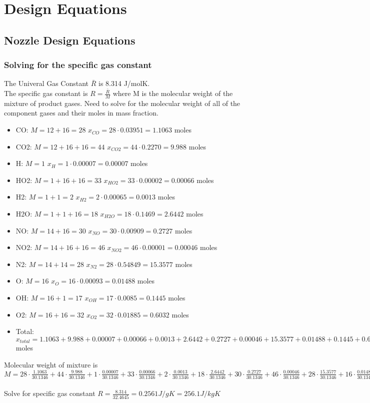 \documentclass[12pt, letter paper]{article}
\begin{document}
	\section{Design Equations}
		\subsection{Nozzle Design Equations}
			\subsubsection{Solving for the specific gas constant}
				The Univeral Gas Constant $ \bar{R} $ is 8.314 J/molK. \\
				The specific gas constant is $ R = \frac{\bar{R}}{M} $ where M is the molecular weight of the mixture of product gases.
				Need to solve for the molecular weight of all of the component gases and their moles in mass fraction.
				\begin{itemize}
					\item CO: $ M = 12 +16 = 28 $ $x_{CO} = 28 \cdot 0.03951 = 1.1063 $ moles
					\item CO2: $ M = 12 + 16  + 16 = 44 $ $ x_{CO2} = 44 \cdot 0.2270 = 9.988 $ moles
					\item H: $ M = 1 $ $ x_{H} = 1 \cdot 0.00007 = 0.00007 $ moles
					\item HO2: $ M = 1 + 16 + 16 = 33 $ $ x_{HO2} = 33 \cdot 0.00002 = 0.00066 $ moles
					\item H2: $ M = 1 + 1 = 2 $ $ x_{H2} = 2 \cdot 0.00065 = 0.0013 $ moles
					\item H2O: $ M = 1 + 1 + 16 = 18 $ $ x_{H2O} = 18 \cdot 0.1469 = 2.6442 $ moles
					\item NO: $ M = 14 + 16 = 30 $ $ x_{NO} = 30 \cdot 0.00909 = 0.2727 $ moles
					\item NO2: $ M = 14 + 16 + 16 = 46 $ $ x_{NO2} = 46 \cdot 0.00001 = 0.00046 $ moles
					\item N2: $ M = 14 + 14 = 28 $ $ x_{N2} = 28 \cdot 0.54849 = 15.3577 $ moles
					\item O: $ M = 16 $ $ x_{O} = 16 \cdot 0.00093 = 0.01488 $ moles
					\item OH: $ M =16 + 1 = 17 $ $ x_{OH} = 17 \cdot 0.0085 = 0.1445 $ moles
					\item O2: $ M =16 + 16  = 32 $ $ x_{O2} = 32 \cdot 0.01885 = 0.6032 $ moles
					\item Total: $ x_{total} = 1.1063 + 9.988 + 0.00007 + 0.00066 + 0.0013 + 2.6442 + 0.2727 + 0.00046 + 15.3577 + 0.01488 + 0.1445 +0.6032 = 30.1346 $ moles
				\end{itemize}
				Molecular weight of mixture is $M = 28 \cdot \frac{1.1063}{30.1346} + 44 \cdot \frac{9.988}{30.1346} + 1 \cdot \frac{0.00007}{30.1346} + 33 \cdot \frac{0.00066}{30.1346} + 2 \cdot \frac{0.0013}{30.1346} + 18 \cdot \frac{2.6442}{30.1346} + 30 \cdot \frac{0.2727}{30.1346} + 46 \cdot \frac{0.00046}{30.1346} + 28 \cdot \frac{15.3577}{30.1346} + 16 \cdot \frac{0.01488}{30.1346} + 17 \cdot \frac{0.1445}{30.1346} + 32 \cdot \frac{0.6032}{30.1346} = 32.4645 g/mol$ \\ \\
				Solve for specific gas constant $ R = \frac{8.314}{32.4645} = 0.2561 J/gK = 256.1 J/kgK $ 
\end{document}
